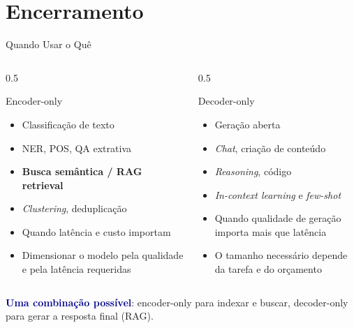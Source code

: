 \documentclass[aspectratio=169, xcolor=dvipsnames]{beamer}
\begin{document}
  \section{Encerramento}

  \begin{frame}{Quando Usar o Quê}
    \begin{columns}[T]
      \begin{column}{0.5\textwidth}
        \begin{block}{Encoder-only}
          \begin{itemize}
            \item Classificação de texto
            \item NER, POS, QA extrativa
            \item \textbf{Busca semântica / RAG retrieval}
            \item \textit{Clustering}, deduplicação
            \item Quando latência e custo importam
            \item Dimensionar o modelo pela qualidade e pela latência requeridas
          \end{itemize}
        \end{block}
      \end{column}
      \begin{column}{0.5\textwidth}
        \begin{block}{Decoder-only}
          \begin{itemize}
            \item Geração aberta
            \item \textit{Chat}, criação de conteúdo
            \item \textit{Reasoning}, código
            \item \textit{In-context learning} e \textit{few-shot}
            \item Quando qualidade de geração importa mais que latência
            \item O tamanho necessário depende da tarefa e do orçamento
          \end{itemize}
        \end{block}
      \end{column}
    \end{columns}
    \vspace{0.3em}
    \textcolor{DarkBlue}{\textbf{Uma combinação possível}}: encoder-only para indexar e buscar, decoder-only para gerar a resposta final (RAG).
  \end{frame}
\end{document}
